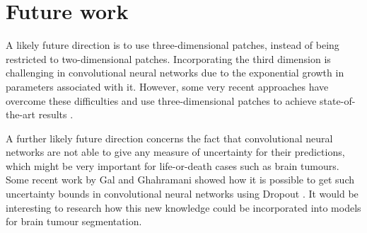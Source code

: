 \documentclass[12pt,a4paper,twoside,openright]{report}
\begin{document}
\section{Future work}
A likely future direction is to use three-dimensional patches, instead of being restricted to two-dimensional patches. Incorporating the third dimension is challenging in convolutional neural networks due to the exponential growth in parameters associated with it. However, some very recent approaches have overcome these difficulties and use \mbox{three-dimensional} patches to achieve state-of-the-art results \cite{kamnitas}. 

A further likely future direction concerns the fact that convolutional neural networks are not able to give any measure of uncertainty for their predictions, which might be very important for life-or-death cases such as brain tumours. Some recent work by Gal and Ghahramani showed how it is possible to get such uncertainty bounds in convolutional neural networks using Dropout \cite{Gal2015Dropout}. It would be interesting to research how this new knowledge could be incorporated into models for brain tumour segmentation.




\appendix

%
%
\end{document}
